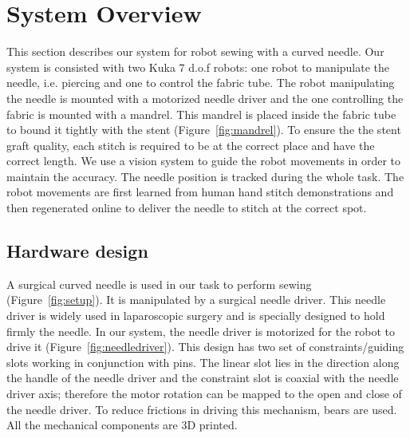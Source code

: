 \section{System Overview}
This section describes our system for robot sewing with a curved needle. Our system is consisted with two Kuka 7 d.o.f robots: one robot to manipulate the needle, i.e. piercing and one to control the fabric tube. The robot manipulating the needle is mounted with a motorized needle driver and the one controlling the fabric is mounted with a mandrel. This mandrel is placed inside the fabric tube to bound it tightly with the stent (Figure~\ref{fig:mandrel}). To ensure the the stent graft quality, each stitch is required to be at the correct place and have the correct length. We use a vision system to guide the robot movements in order to maintain the accuracy. The needle position is tracked during the whole task. The robot movements are first learned from human hand stitch demonstrations and then regenerated online to deliver the needle to stitch at the correct spot.



\subsection{Hardware design}

A surgical curved needle is used in our task to perform sewing (Figure~\ref{fig:setup}). It is manipulated by a surgical needle driver. This needle driver is widely used in laparoscopic surgery and is specially designed to hold firmly the needle.
In our system, the needle driver is motorized for the robot to drive it (Figure~\ref{fig:needledriver}). This design has two set of constraints/guiding slots working in conjunction with pins. The linear slot lies in the direction along the handle of the needle driver and the constraint slot is coaxial with the needle driver axis; therefore the motor rotation can be mapped to the open and close of the needle driver. To reduce frictions in driving this mechanism, bears are used. All the mechanical components are 3D printed.

